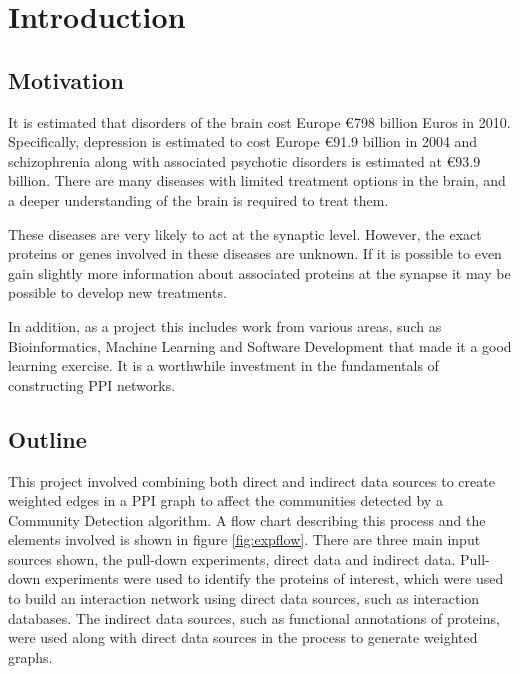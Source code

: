 \chapter{Introduction}
\label{introduction}



\section{Motivation}

It is estimated that disorders of the brain cost Europe €798 billion Euros in 2010\autocite{olesen_economic_2012}.
Specifically, depression is estimated to cost Europe €91.9 billion in 2004 and schizophrenia along with associated psychotic disorders is estimated at €93.9 billion.
There are many diseases with limited treatment options in the brain, and a deeper understanding of the brain is required to treat them. 


These diseases are very likely to act at the synaptic level\autocites{chua_architecture_2010,synsys}.
However, the exact proteins or genes involved in these diseases are unknown.
If it is possible to even gain slightly more information about associated proteins at the synapse it may be possible to develop new treatments\autocite{li_interaction_2010}.

In addition, as a project this includes work from various areas, such as Bioinformatics, Machine Learning and Software Development that made it a good learning exercise. %
It is a worthwhile investment in the fundamentals of constructing PPI networks. %

\section{Outline}

This project involved combining both direct and indirect data sources to create weighted edges in a PPI graph to affect the communities detected by a Community Detection algorithm.
A flow chart describing this process and the elements involved is shown in figure \ref{fig:expflow}.
There are three main input sources shown, the pull-down experiments, direct data and indirect data.
Pull-down experiments were used to identify the proteins of interest, which were used to build an interaction network using direct data sources, such as interaction databases.
The indirect data sources, such as functional annotations of proteins, were used along with direct data sources in the process to generate weighted graphs.

